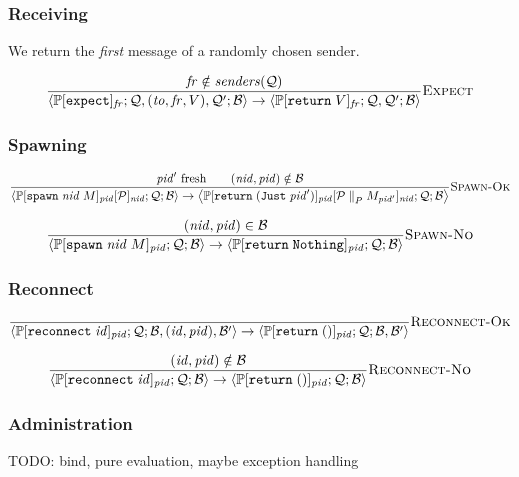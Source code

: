 \documentclass{article}
\newcommand{\sReturn}{\mathtt{return}}
\newcommand{\sExpect}{\mathtt{expect}}
\newcommand{\sSpawn}{\mathtt{spawn}}
\newcommand{\sReconnect}{\mathtt{reconnect}}
\newcommand{\sPar}{\mathrel{{\parallel}_P}}
\newcommand{\sPid}{\ensuremath{\mathit{pid}}}
\newcommand{\sNid}{\ensuremath{\mathit{nid}}}
\newcommand{\sSystem}[3]{\left\langle #1 ; #2 ; #3 \right\rangle}
\newcommand{\sQueue}{\mathcal{Q}}
\newcommand{\sProcesses}{\mathcal{P}}
\newcommand{\sBlacklist}{\mathcal{B}}
\newcommand{\sJust}[1]{\mathtt{Just} \; {#1}}
\newcommand{\sNothing}{\mathtt{Nothing}}
\newcommand{\sCtxt}[1]{\mathbb{#1}}
\newcommand{\sSenders}{\mathit{senders}}
\begin{document}
\subsubsection{Receiving}

We return the \emph{first} message of a randomly chosen sender.

\begin{equation*}
\frac{
  \mathit{fr} \notin \sSenders(\sQueue)
}{
  \sSystem{\sCtxt{P}[ \sExpect ]_\mathit{fr}}
          {\sQueue, (\mathit{to}, \mathit{fr}, V), \sQueue'}
          {\sBlacklist}
\rightarrow
  \sSystem{\sCtxt{P}[ \sReturn \; V ]_\mathit{fr}}
          {\sQueue, \sQueue'}
          {\sBlacklist}
} \textsc{Expect}
\end{equation*}

\subsubsection{Spawning}

\begin{equation*}
\frac{
  \sPid' \text{ fresh} \qquad
  (\sNid, \sPid) \notin \sBlacklist
}{
  \sSystem{\sCtxt{P}[ \sSpawn \; \sNid \; M ]_\sPid[\sProcesses]_\sNid}
          {\sQueue}
          {\sBlacklist}
\rightarrow          
  \sSystem{\sCtxt{P}[ \sReturn \; (\sJust{\sPid'}) ]_\sPid[\sProcesses \sPar M_{\sPid'}]_\sNid}
          {\sQueue}
          {\sBlacklist}
} \textsc{Spawn-Ok}
\end{equation*}

\begin{equation*}
\frac{
  (\sNid, \sPid) \in \sBlacklist
}{
  \sSystem{\sCtxt{P}[ \sSpawn \; \sNid \; M ]_\sPid}
          {\sQueue}
          {\sBlacklist}
\rightarrow          
  \sSystem{\sCtxt{P}[ \sReturn \; \sNothing ]_\sPid}
          {\sQueue}
          {\sBlacklist}
} \textsc{Spawn-No}
\end{equation*}

\subsubsection{Reconnect}

\begin{equation*}
\frac{
}{
  \sSystem{\sCtxt{P}[ \sReconnect \; \mathit{id} ]_\sPid}
          {\sQueue}
          {\sBlacklist, (\mathit{id}, \sPid), \sBlacklist'}
\rightarrow
  \sSystem{\sCtxt{P}[ \sReturn \; () ]_\sPid}
          {\sQueue}
          {\sBlacklist, \sBlacklist'}
} \textsc{Reconnect-Ok}
\end{equation*}

\begin{equation*}
\frac{
  (\mathit{id}, \sPid) \notin \sBlacklist
}{
  \sSystem{\sCtxt{P}[ \sReconnect \; \mathit{id} ]_\sPid}
          {\sQueue}
          {\sBlacklist}
\rightarrow
  \sSystem{\sCtxt{P}[ \sReturn \; () ]_\sPid}
          {\sQueue}
          {\sBlacklist}
} \textsc{Reconnect-No}
\end{equation*}

\subsubsection{Administration}

TODO: bind, pure evaluation, maybe exception handling
\end{document}
